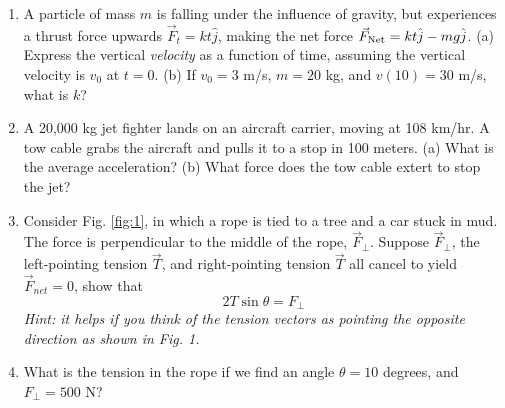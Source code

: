 \documentclass{article}
\begin{document}
\begin{enumerate}
\item A particle of mass $m$ is falling under the influence of gravity, but experiences a thrust force upwards $\vec{F}_t = kt\hat{j}$, making the net force $\vec{F}_{\rm Net} = kt\hat{j}-mg\hat{j}$.  (a) Express the vertical \textit{velocity} as a function of time, assuming the vertical velocity is $v_0$ at $t=0$. (b) If $v_0 = 3$ m/s, $m = 20$ kg, and $v(10) = 30$ m/s, what is $k$? \\ \vspace{5cm}
\item A 20,000 kg jet fighter lands on an aircraft carrier, moving at 108 km/hr. A tow cable grabs the aircraft and pulls it to a stop in 100 meters. (a) What is the average acceleration? (b) What force does the tow cable extert to stop the jet? \\ \vspace{4cm}
\item Consider Fig. \ref{fig:1}, in which a rope is tied to a tree and a car stuck in mud.  The force is perpendicular to the middle of the rope, $\vec{F}_{\perp}$.  Suppose $\vec{F}_{\perp}$, the left-pointing tension $\vec{T}$, and right-pointing tension $\vec{T}$ all cancel to yield $\vec{F}_{net} = 0$, show that
\begin{equation}
2T\sin\theta = F_{\perp}
\end{equation}
\textit{Hint: it helps if you think of the tension vectors as pointing the opposite direction as shown in Fig. 1.} \\ \vspace{4cm}
\item What is the tension in the rope if we find an angle $\theta = 10$ degrees, and $F_{\perp} = 500$ N?
\end{enumerate}
\end{document}
